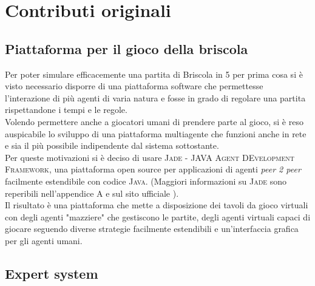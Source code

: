 
\section{Contributi originali}
\subsection{Piattaforma per il gioco della briscola}
Per poter simulare efficacemente una partita di Briscola in 5 per prima cosa si è visto necessario disporre di una piattaforma software che permettesse l'interazione di più agenti di varia natura e fosse in grado di regolare una partita rispettandone i tempi e le regole.\\
Volendo permettere anche a giocatori umani di prendere parte al gioco, si è reso auspicabile lo sviluppo di una piattaforma multiagente che funzioni anche in rete e sia il più possibile indipendente dal sistema sottostante.\\
Per queste motivazioni si è deciso di usare \textsc{Jade - JAVA Agent DEvelopment Framework}, una piattaforma open source per applicazioni di agenti \emph{peer 2 peer} facilmente estendibile con codice \textsc{Java}.
(Maggiori informazioni su \textsc{Jade} sono reperibili nell'appendice A e sul sito ufficiale \cite{jade}).\\
Il risultato è una piattaforma che mette a disposizione dei tavoli da gioco virtuali con degli agenti "mazziere" che gestiscono le partite, degli agenti virtuali capaci di giocare seguendo diverse strategie facilmente estendibili e un'interfaccia grafica per gli agenti umani.

\subsection{Expert system}

